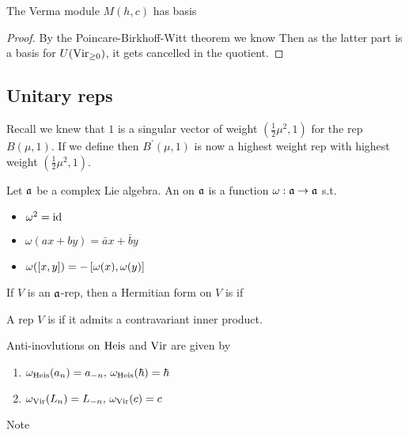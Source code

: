 \documentclass{article}
\begin{document}
\begin{prop}
The Verma module $M(h,c)$ has basis 
\end{prop}
\begin{proof}
By the Poincare-Birkhoff-Witt theorem we know 
Then as the latter part is a basis for $U(\Vir_{\geq 0})$, it gets cancelled in the quotient. 
\end{proof}

\subsection{Unitary reps}

Recall we knew that $1$ is a singular vector of weight $(\frac{1}{2}\mu^2,1)$ for the rep $B(\mu,1)$. If we define 
then $B^\prime(\mu,1)$ is now a highest weight rep with highest weight $(\frac{1}{2}\mu^2,1)$. 

\begin{definition}
Let $\mf{a}$ be a complex Lie algebra. An  on $\mf{a}$ is a function $\omega : \mf{a} \to \mf{a}$ s.t. 
\begin{itemize}
    \item $\omega^2 = \id$
    \item $\omega(ax+by) =\bar{a}x + \bar{b}y$
    \item $\omega(\comm[x]{y}) = - \comm[\omega(x)]{\omega(y)}$
\end{itemize}
\end{definition}

\begin{definition}
If $V$ is an $\mf{a}$-rep, then a Hermitian form on $V$ is  if 
\end{definition}

\begin{definition}
A rep $V$ is  if it admits a contravariant inner product.
\end{definition}

\begin{example}
Anti-inovlutions on $\Heis$ and $\Vir$ are given by 
\begin{enumerate}
    \item $\omega_{\Heis}(a_n) = a_{-n}, \, \omega_{\Heis}(\hbar) = \hbar$
    \item $\omega_{\Vir}(L_n) = L_{-n}, \, \omega_{\Vir}(c) = c$
\end{enumerate}
Note 
\end{example}
\end{document}
